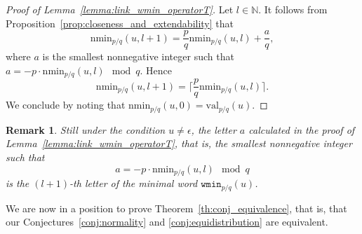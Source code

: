 \documentclass{template_arxiv}
\newtheorem{remark}[theorem]{Remark}
\numberwithin{equation}{section}
\newcommand{\N}{\mathbb N}
\newcommand{\eps}{\epsilon}
\newcommand{\wmin}{\mathtt{wmin}}
\newcommand{\nmin}{\mathrm{nmin}}
\newcommand{\val}{\mathrm{val}}
\begin{document}
\begin{proof}[Proof of Lemma~\ref{lemma:link_wmin_operatorT}]
	Let $l \in \N$. It follows from Proposition~\ref{prop:closeness_and_extendability} that	
	\[\nmin_{p/q}(u,l+1) = \frac{p}{q} \nmin_{p/q}(u,l) +  \frac{a}{q}, \]
	where $a$ is the smallest nonnegative integer such that $a=-p\cdot\nmin_{p/q}(u,l) \mod q$. Hence
	\[\nmin_{p/q}(u,l+1) = \Big\lceil \frac{p}{q} \nmin_{p/q}(u,l)\Big\rceil. \]
	We conclude by noting that $\nmin_{p/q}(u,0)=\val_{p/q}(u)$.
\end{proof}

\begin{remark}\label{rk:how_to_compute_min_words}
	Still under the condition $u\neq\eps$, the letter $a$ calculated in the proof of Lemma~\ref{lemma:link_wmin_operatorT}, that is, the smallest nonnegative integer such that
	\[a = -p\cdot\nmin_{p/q}(u,l) \mod q\] is the $(l+1)$-th letter of the minimal word $\wmin_{p/q}(u)$.
\end{remark}


\bigskip
We are now in a position to prove  Theorem~\ref{th:conj_equivalence}, that is, that our Conjectures~\ref{conj:normality} and \ref{conj:equidistribution} are equivalent. 
\end{document}
